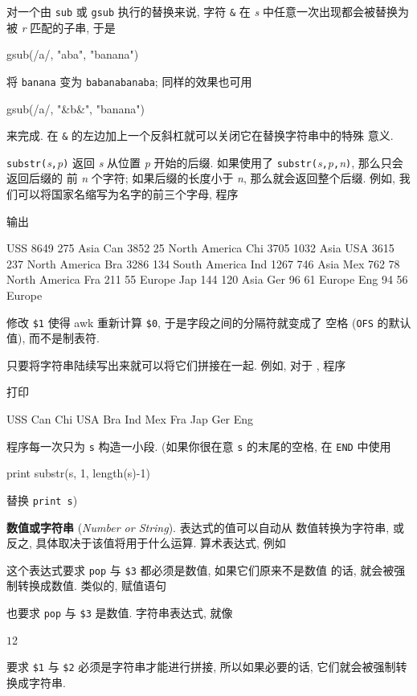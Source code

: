 对一个由 \verb'sub' 或 \verb'gsub' 执行的替换来说, 字符 \verb'&' 在
\textit{s} 中任意一次出现都会被替换为被 \textit{r} 匹配的子串, 于是
\begin{awkcode}
    gsub(/a/, "aba", "banana")
\end{awkcode}
将 \verb'banana' 变为 \verb'babanabanaba'; 同样的效果也可用
\begin{awkcode}
    gsub(/a/, "&b&", "banana")
\end{awkcode}
来完成. 在 \verb'&' 的左边加上一个反斜杠就可以关闭它在替换字符串中的特殊
意义.

\verb'substr('\textit{s}\verb','\textit{p}\verb')'
返回 \textit{s} 从位置 \textit{p} 开始的后缀. 如果使用了
\verb'substr('\textit{s}\verb','\textit{p}\verb','\textit{n}\verb')',
那么只会返回后缀的
前 \textit{n} 个字符; 如果后缀的长度小于 \textit{n}, 那么就会返回整个后缀.
例如, 我们可以将国家名缩写为名字的前三个字母, 程序
输出
\begin{awkcode}
    USS 8649 275 Asia
    Can 3852 25 North America
    Chi 3705 1032 Asia
    USA 3615 237 North America
    Bra 3286 134 South America
    Ind 1267 746 Asia
    Mex 762 78 North America
    Fra 211 55 Europe
    Jap 144 120 Asia
    Ger 96 61 Europe
    Eng 94 56 Europe
\end{awkcode}
修改 \verb'$1' 使得 awk 重新计算 \verb'$0', 于是字段之间的分隔符就变成了
空格 (\verb'OFS' 的默认值), 而不是制表符.

只要将字符串陆续写出来就可以将它们拼接在一起. 例如, 对于
, 程序
打印
\begin{awkcode}
    USS Can Chi USA Bra Ind Mex Fra Jap Ger Eng
\end{awkcode}
程序每一次只为 \verb's' 构造一小段. (如果你很在意 \verb's' 的末尾的空格,
在 \verb'END' 中使用
\begin{awkcode}
    print substr(s, 1, length(s)-1)
\end{awkcode}
替换 \verb'print s')

\textbf{数值或字符串} (\emph{Number or String}). 表达式的值可以自动从
数值转换为字符串, 或反之, 具体取决于该值将用于什么运算. 算术表达式, 例如
这个表达式要求 \verb'pop' 与 \verb'$3' 都必须是数值, 如果它们原来不是数值
的话, 就会被强制转换成数值. 类似的, 赋值语句
也要求 \verb'pop' 与 \verb'$3' 是数值. 字符串表达式, 就像
\begin{awkcode}
    $1 $2
\end{awkcode}
要求 \verb'$1' 与 \verb'$2' 必须是字符串才能进行拼接, 所以如果必要的话,
它们就会被强制转换成字符串.

